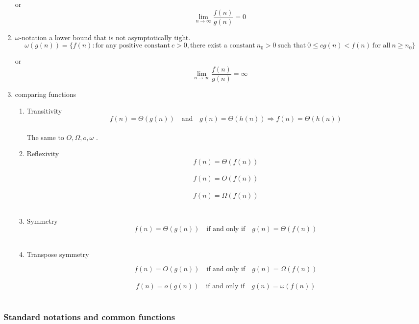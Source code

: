 \documentclass[11pt]{article}
\begin{document}
\begin{enumerate}
or \\
\begin{equation}
\lim_{n\rightarrow \infty}\frac{f(n)}{g(n)} = 0
\end{equation}

\item $\omega$-notation
\label{sec-2-3-1-6}
a lower bound that is not asymptotically tight. \\

\begin{equation}
\omega(g(n)) = \{f(n): \text{for any positive constant} \ c > 0, \text{there exist a constant} \ n_0 > 0 \ \text{such that} \
0 \le cg(n) < f(n) \ \text{for all} \ n \ge n_0 \}
\end{equation}


or \\
\begin{equation}
\lim_{n\rightarrow \infty}\frac{f(n)}{g(n)} = \infty
\end{equation}

\item comparing functions
\label{sec-2-3-1-7}
\begin{enumerate}
\item Transitivity
\label{sec-2-3-1-7-1}
$$
f(n) = \Theta(g(n)) \quad \text{and} \quad g(n) = \Theta(h(n)) \Rightarrow f(n) = \Theta(h(n))
$$ \\
The same to $O, \Omega, o, \omega$ . \\

\item Reflexivity
\label{sec-2-3-1-7-2}
$$f(n) = \Theta(f(n))$$ \\
$$f(n) = O(f(n)) $$ \\
$$f(n) = \Omega(f(n)) $$ \\

\item Symmetry
\label{sec-2-3-1-7-3}
$$ f(n) = \Theta(g(n)) \quad \text{if and only if} \quad g(n) = \Theta(f(n)) $$ \\
\item Transpose symmetry
\label{sec-2-3-1-7-4}

$$ f(n) = O(g(n)) \quad \text{if and only if} \quad g(n) = \Omega(f(n)) $$ \\
$$ f(n) = o(g(n)) \quad \text{if and only if} \quad g(n) = \omega(f(n)) $$ \\
\end{enumerate}
\end{enumerate}
\subsubsection{Standard notations and common functions}
\label{sec-2-3-2}
\end{document}

